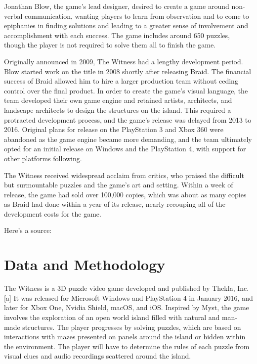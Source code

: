 \documentclass[11pt,a4paper]{scrartcl}
\begin{document}
Jonathan Blow, the game's lead designer, desired to create a game around non-verbal communication, wanting players to learn from observation and to come to epiphanies in finding solutions and leading to a greater sense of involvement and accomplishment with each success. The game includes around 650 puzzles, though the player is not required to solve them all to finish the game.

Originally announced in 2009, The Witness had a lengthy development period. Blow started work on the title in 2008 shortly after releasing Braid. The financial success of Braid allowed him to hire a larger production team without ceding control over the final product. In order to create the game's visual language, the team developed their own game engine and retained artists, architects, and landscape architects to design the structures on the island. This required a protracted development process, and the game's release was delayed from 2013 to 2016. Original plans for release on the PlayStation 3 and Xbox 360 were abandoned as the game engine became more demanding, and the team ultimately opted for an initial release on Windows and the PlayStation 4, with support for other platforms following.

The Witness received widespread acclaim from critics, who praised the difficult but surmountable puzzles and the game's art and setting. Within a week of release, the game had sold over 100,000 copies, which was about as many copies as Braid had done within a year of its release, nearly recouping all of the development costs for the game.

Here's a source: \citet{Kalemli-Ozcan2015} \\

\section{Data and Methodology}\label{sec:datamethod}

The Witness is a 3D puzzle video game developed and published by Thekla, Inc.[a] It was released for Microsoft Windows and PlayStation 4 in January 2016, and later for Xbox One, Nvidia Shield, macOS, and iOS. Inspired by Myst, the game involves the exploration of an open world island filled with natural and man-made structures. The player progresses by solving puzzles, which are based on interactions with mazes presented on panels around the island or hidden within the environment. The player will have to determine the rules of each puzzle from visual clues and audio recordings scattered around the island.
\end{document}
